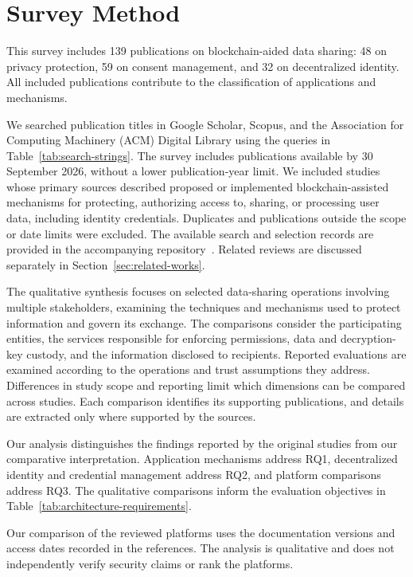 \section{Survey Method}
\label{sec:methodology}
\label{sec:update-method}
\label{sec:qualitative-synthesis-method}


This survey includes 139 publications on blockchain-aided data sharing: 48 on privacy protection, 59 on consent management, and 32 on decentralized identity. All included publications contribute to the classification of applications and mechanisms.

We searched publication titles in Google Scholar, Scopus, and the Association for Computing Machinery (ACM) Digital Library using the queries in Table~\ref{tab:search-strings}. The survey includes publications available by 30 September 2026, without a lower publication-year limit. We included studies whose primary sources described proposed or implemented blockchain-assisted mechanisms for protecting, authorizing access to, sharing, or processing user data, including identity credentials. Duplicates and publications outside the scope or date limits were excluded. The available search and selection records are provided in the accompanying repository~\cite{our-github-survey}. Related reviews are discussed separately in  Section~\ref{sec:related-works}.

The qualitative synthesis focuses on selected data-sharing operations involving multiple stakeholders, examining the techniques and mechanisms used to protect information and govern its exchange. The comparisons consider the participating entities, the services responsible for enforcing permissions, data and decryption-key custody, and the information disclosed to recipients. Reported evaluations are examined according to the operations and trust assumptions they address. Differences in study scope and reporting limit which dimensions can be compared across studies. Each comparison identifies its supporting publications, and details are extracted only where supported by the sources.

Our analysis distinguishes the findings reported by the original studies from our comparative interpretation. Application mechanisms address RQ1, decentralized identity and credential management address RQ2, and platform comparisons address RQ3. The qualitative comparisons inform the evaluation objectives in Table~\ref{tab:architecture-requirements}.

Our comparison of the reviewed platforms uses the documentation versions and access dates recorded in the references. The analysis is qualitative and does not independently verify security claims or rank the platforms.

